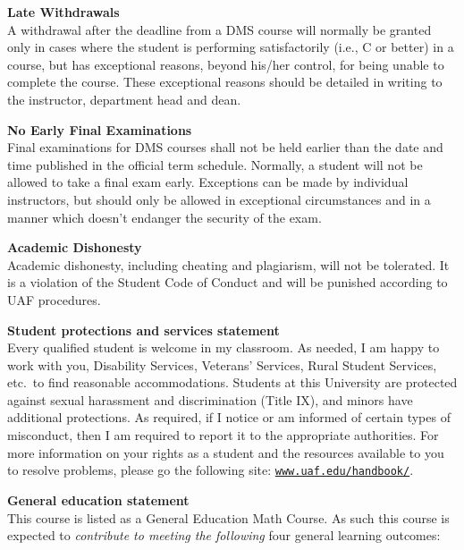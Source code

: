 \documentclass[12pt]{article}
\renewcommand{\emph}[1]{\textsf{\textbf{#1}}}
\newcommand{\localhead}[1]{\par\smallskip\textbf{#1} \smallskip\nobreak\\}%
\def\subheading#1{\localhead{\emph{#1}}}
\begin{document}
\subheading{Late Withdrawals} 
A withdrawal after the deadline from a DMS course will
  normally be granted only in cases where the student is performing
  satisfactorily (i.e., C or better) in a course, but has exceptional
  reasons, beyond his/her control, for being unable to complete the
  course. These exceptional reasons should be detailed in writing to
  the instructor, department head and dean.

\subheading{No Early Final Examinations}
Final examinations for DMS
  courses shall not be held earlier than the date and time published
  in the official term schedule. Normally, a student will not be
  allowed to take a final exam early. Exceptions can be made by
  individual instructors, but should only be allowed in exceptional
  circumstances and in a manner which doesn't endanger the security of
  the exam.

\subheading{Academic Dishonesty}
Academic dishonesty, including cheating and plagiarism, will not
be tolerated.  It is a violation of the Student Code of Conduct
and will be punished according to UAF procedures.


\subheading{Student protections and services statement}
Every qualified student is welcome in my classroom.  As needed, I am happy to work with you, Disability Services, Veterans' Services, Rural Student Services, etc.~to find reasonable accommodations.  Students at this University are protected against sexual harassment and discrimination (Title IX), and minors have additional protections.  As required, if I notice or am informed of certain types of misconduct, then I am required to report it to the appropriate authorities.  For more information on your rights as a student and the resources available to you to resolve problems, please go the following site: \href{https://www.uaf.edu/handbook/}{\texttt{www.uaf.edu/handbook/}}.

\clearpage\newpage

\strut

\vspace{-12pt}

\subheading{General education statement}
This course is listed as a General Education Math Course.  As such this course is expected to \textsl{contribute to meeting the following} four general learning outcomes:
\end{document}
